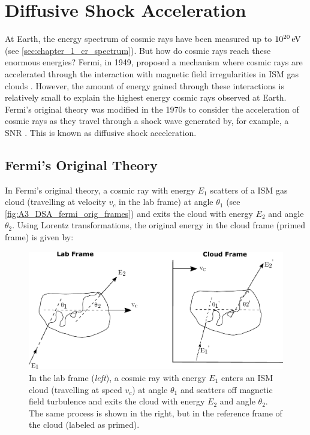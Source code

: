 \chapter{Diffusive Shock Acceleration} \label{A3_DSA}

At Earth, the energy spectrum of cosmic rays have been measured up to $10^{20}\,\si{\electronvolt}$ (see \autoref{sec:chapter_1_cr_spectrum}). But how do cosmic rays reach these enormous energies? Fermi, in 1949, proposed a mechanism where cosmic rays are accelerated through the interaction with magnetic field irregularities in ISM gas clouds \citep{1949PhRv...75.1169F}. However, the amount of energy gained through these interactions is relatively small to explain the highest energy cosmic rays observed at Earth. Fermi's original theory was modified in the 1970s to consider the acceleration of cosmic rays as they travel through a shock wave generated by, for example, a SNR \citep{1977DoSSR.234.1306K,1977ICRC...11..132A,1978MNRAS.182..147B,1978MNRAS.182..443B,1978ApJ...221L..29B}. This is known as diffusive shock acceleration.

\section{Fermi's Original Theory}

In Fermi's original theory, a cosmic ray with energy $E_1$  scatters of a ISM gas cloud (travelling at velocity $v_c$ in the lab frame) at angle $\theta_1$ (see \autoref{fig:A3_DSA_fermi_orig_frames}) and exits the cloud with energy $E_2$ and angle $\theta_2$. Using Lorentz transformations, the original energy in the cloud frame (primed frame) is given by:

\begin{figure}[h!]
    \centering
    \includegraphics{A3_Diffusive_Shock_Acceleration/Images/fermi_original_theory_frames.pdf}
    \caption{In the lab frame (\textit{left}), a cosmic ray with energy $E_1$ enters an ISM cloud (travelling at speed $v_c$) at angle $\theta_1$ and scatters off magnetic field turbulence and exits the cloud with energy $E_2$ and angle $\theta_2$. The same process is shown in the right, but in the reference frame of the cloud (labeled as primed).}
    \label{fig:A3_DSA_fermi_orig_frames}
\end{figure}


